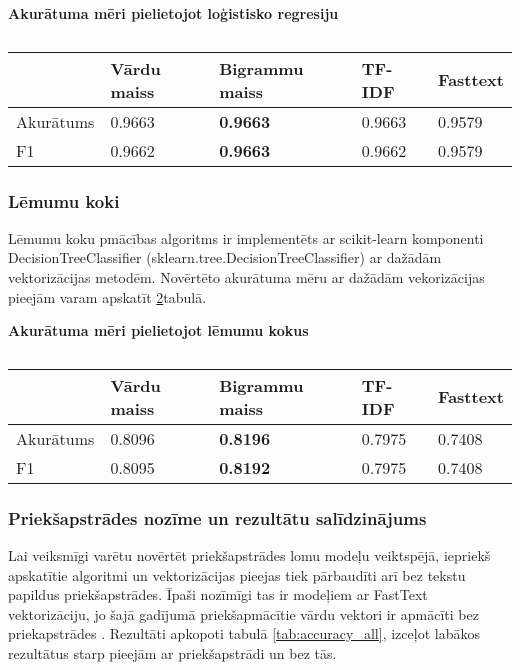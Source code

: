 \begin{table}[H]
\centering
\caption{\label{tab:accuracy_lr}}
\textbf{Akurātuma mēri pielietojot loģistisko regresiju\\}
\begin{tabular}{|l||l|l|l|l|}
\hline
& Vārdu maiss & Bigrammu maiss & TF-IDF & Fasttext \\ \hline
Akurātums & 0.9663 & \textbf{0.9663} & 0.9663 & 0.9579 \\ \hline
F1 & 0.9662 & \textbf{0.9663} & 0.9662 & 0.9579 \\ \hline
\end{tabular}
\end{table}

\subsubsection{Lēmumu koki}
Lēmumu koku pmācības algoritms ir implementēts ar scikit-learn komponenti DecisionTreeClassifier (sklearn.tree.DecisionTreeClassifier) ar dažādām vektorizācijas metodēm. Novērtēto akurātuma mēru ar dažādām vekorizācijas pieejām varam apskatīt \ref{tab:accuracy_dt}tabulā.

\begin{table}[H]
\centering
\caption{\label{tab:accuracy_dt}}
\textbf{Akurātuma mēri pielietojot lēmumu kokus\\}
\begin{tabular}{|l||l|l|l|l|}
\hline
& Vārdu maiss & Bigrammu maiss & TF-IDF & Fasttext \\ \hline
Akurātums & 0.8096 & \textbf{0.8196} & 0.7975 & 0.7408 \\ \hline
F1 & 0.8095 & \textbf{0.8192} & 0.7975 & 0.7408 \\ \hline
\end{tabular}
\end{table}

\subsubsection{Priekšapstrādes nozīme un rezultātu salīdzinājums}

Lai veiksmīgi varētu novērtēt priekšapstrādes lomu modeļu veiktspējā, iepriekš apskatītie algoritmi un vektorizācijas pieejas tiek pārbaudīti arī bez tekstu papildus priekšapstrādes. Īpaši nozīmīgi tas ir modeļiem ar FastText vektorizāciju, jo šajā gadījumā priekšapmācītie vārdu vektori ir apmācīti bez priekapstrādes \cite{grave2018learning}. Rezultāti apkopoti tabulā \ref{tab:accuracy_all}, izceļot labākos rezultātus starp pieejām ar priekšapstrādi un bez tās.


